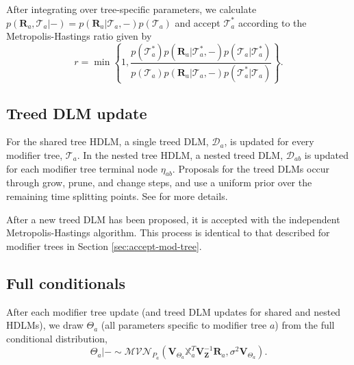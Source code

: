\documentclass[12pt]{article}
\begin{document}
After integrating over tree-specific parameters, we calculate $p(\mathbf{R}_a,\mathcal{T}_{a}|-)=p(\mathbf{R}_a|\mathcal{T}_{a},-)p(\mathcal{T}_{a})$ and accept $\mathcal{T}_{a}^*$ according to the Metropolis-Hastings ratio given by
\begin{equation}\label{eq:single_mh}
r=\min\left\{1,\frac{p(\mathcal{T}_{a}^*)p(\mathbf{R}_a|\mathcal{T}_{a}^*,-)p(\mathcal{T}_{a}\vert\mathcal{T}_{a}^*)}{p(\mathcal{T}_{a})p(\mathbf{R}_a|\mathcal{T}_{a},-)p(\mathcal{T}_{a}^*\vert \mathcal{T}_{a})}\right\}.
\end{equation}



\subsection{Treed DLM update}
For the shared tree HDLM, a single treed DLM, $\mathcal{D}_a$, is updated for every modifier tree, $\mathcal{T}_a$. In the nested tree HDLM, a nested treed DLM, $\mathcal{D}_{ab}$ is updated for each modifier tree terminal node $\eta_{ab}$. Proposals for the treed DLMs occur through grow, prune, and change steps, and use a uniform prior over the remaining time splitting points. See \cite{Mork2023EstimatingPairs} for more details.

After a new treed DLM has been proposed, it is accepted with the independent Metropolis-Hastings algorithm. This process is identical to that described for modifier trees in Section \ref{sec:accept-mod-tree}.



\subsection{Full conditionals}
After each modifier tree update (and treed DLM updates for shared and nested HDLMs), we draw $\Theta_a$ (all parameters specific to modifier tree $a$) from the full conditional distribution,
\begin{equation}\label{eq:mu-posterior}
    \Theta_a|-\sim \mathcal{MVN}_{P_a}\left(\mathbf{V}_{\Theta_a}\mathbb{X}_a^T \mathbf{V}_\mathbf{Z}^{-1}\mathbf{R}_a,\sigma^2 \mathbf{V}_{\Theta_a}\right).
\end{equation}
\end{document}
